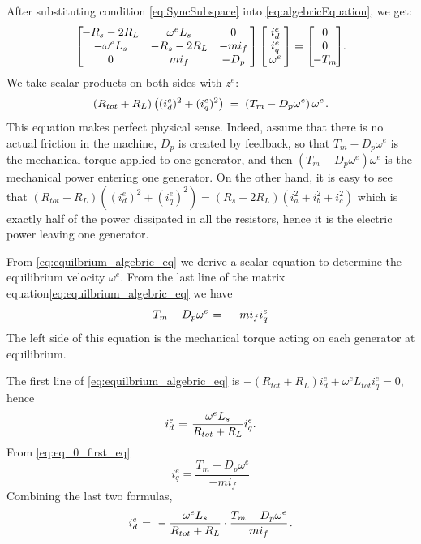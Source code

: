 \documentclass[letterpaper, 10 pt, conference]{ieeeconf}
\renewcommand{\o}    {{\omega}}
\newcommand{\m}      {{\hbox{\hskip 1pt}}}
\newcommand{\nm}     {{\hbox{\hskip -3pt}}}
\begin{document}
After substituting condition \eqref{eq:SyncSubspace} into 
\eqref{eq:algebricEquation}, we get:
\begin{equation} \label{eq:equilbrium_algebric_eq}
   \left[\nm\nm\begin{array}{ccc} -R_s-2R_L & \o^e L_s & 0\\
   -\o^e L_s & -R_s-2R_L & -m i_f\\ 0 & m i_f & -D_p
   \end{array} \nm\right] \left[\nm\begin{array}{c} i_d^e\\
   i_q^e\\ \o^e \end{array} \nm\right] = \left[\nm\nm 
   \begin{array}{c} 0\\ 0\\ -T_m\end{array} \nm\nm\right]\nm\m.
\end{equation}
We take scalar products on both sides with $z^e$:
$$ \left(R_{tot}+R_L\right)\left((i_d^e)^2+(i_q^e)^2\right) \m=\m
   \left(T_m-D_p\o^e\right)\o^e \m.$$
This equation makes perfect physical sense. Indeed, assume that there
is no actual friction in the machine, $D_{p}$ is created by feedback,
so that $T_{m}-D_{p}\omega^{e}$ is the mechanical torque applied to
one generator, and then $\left(T_{m}-D_{p}\omega^{e}\right)\omega^{e}$
is the mechanical power entering one generator. On the other hand, it
is easy to see that $\left(R_{tot}+R_L\right)\left((i_d^e)^2+
(i_q^e)^2\right)=\left(R_s+2R_L\right)\left(i_a^2+i_b^2+i_c^2\right)$
which is exactly half of the power dissipated in all the resistors,
hence it is the electric power leaving one generator.

From \eqref{eq:equilbrium_algebric_eq} we derive a scalar equation to
determine the equilibrium velocity $\omega^{e}$.  From the last line
of the matrix equation\eqref{eq:equilbrium_algebric_eq} we have
\begin{equation} \label{eq:eq_0_first_eq}
   T_m-D_p\o^e \m=\m -mi_f i_q^e 
\end{equation}
The left side of this equation is the mechanical torque acting on each
generator at equilibrium.

The first line of  \eqref{eq:equilbrium_algebric_eq}
is $-\left(R_{tot}+R_{L}\right)i_{d}^{e}+\omega^{e}L_{tot}i_{q}^{e}=0$,
\quad hence
$$i_{d}^{e} \m=\m \frac{\o^eL_s}{R_{tot}+R_L}i_q^e.$$
From \eqref{eq:eq_0_first_eq} 
\begin{equation}
i_{q}^{e}=\frac{T_{m}-D_{p}\omega^{e}}{-mi_{f}}\label{eq:iq_0_}
\end{equation}
Combining the last two formulas,
\begin{equation} \label{eq:id_0_}
   i_{d}^{e} \m=\m -\frac{\o^e L_s}{R_{tot}+R_L} \cdot \frac{T_m-D_p
   \o^e}{mi_f} \m.
\end{equation}
\end{document}
